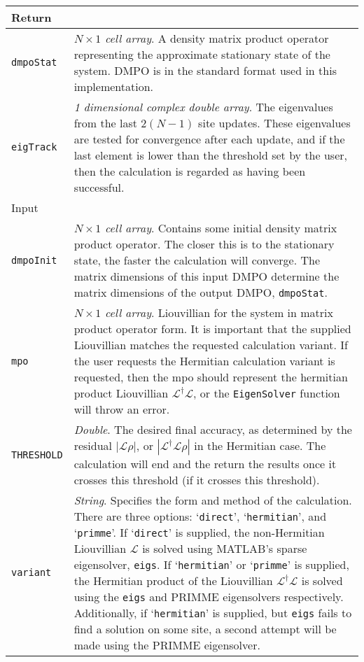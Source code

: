  \begin{longtabu}{X[1,1]X[4,1]}
 \hline
 Return & \\ \hline
 \lstinline$dmpoStat$ & \emph{\(N \times 1\) cell array}. A density matrix product operator representing the approximate stationary state of the system. DMPO is in the standard format used in this implementation. \\
 \lstinline$eigTrack$ & \emph{1 dimensional complex double array}. The eigenvalues from the last \(2(N-1)\) site updates. These eigenvalues are tested for convergence after each update, and if the last element is lower than the threshold set by the user, then the calculation is regarded as having been successful. \\ \hline
 Input & \\ \hline
 \lstinline$dmpoInit$ & \emph{\(N \times 1\) cell array}. Contains some initial density matrix product operator. The closer this is to the stationary state, the faster the calculation will converge. The matrix dimensions of this input DMPO determine the matrix dimensions of the output DMPO, \lstinline$dmpoStat$.  \\
 \lstinline$mpo$ & \emph{\(N \times 1\) cell array}. Liouvillian for the system in matrix product operator form. It is important that the supplied Liouvillian matches the requested calculation variant. If the user requests the Hermitian calculation variant is requested, then the mpo should represent the hermitian product Liouvillian \(\mathcal{L}^{\dagger}\mathcal{L}\), or the \lstinline$EigenSolver$ function will throw an error.\\
 \lstinline$THRESHOLD$ & \emph{Double}. The desired final accuracy, as determined by the residual \(|\mathcal{L}\rho|\), or \(|\mathcal{L}^{\dagger}\mathcal{L}\rho|\) in the Hermitian case. The calculation will end and the return the results once it crosses this threshold (if it crosses this threshold). \\
 \lstinline$variant$ & \emph{String}. Specifies the form and method of the calculation. There are three options: `\lstinline$direct$', `\lstinline$hermitian$', and `\lstinline$primme$'. If `\lstinline$direct$' is supplied, the non-Hermitian Liouvillian \(\mathcal{L}\) is solved using MATLAB's sparse eigensolver, \lstinline$eigs$. If `\lstinline$hermitian$' or `\lstinline$primme$' is supplied, the Hermitian product of the Liouvillian \(\mathcal{L}^{\dagger}\mathcal{L}\) is solved using the \lstinline$eigs$ and PRIMME eigensolvers respectively. Additionally, if `\lstinline$hermitian$' is supplied, but \lstinline$eigs$ fails to find a solution on some site, a second attempt will be made using the PRIMME eigensolver. \\
 \hline
 \end{longtabu}
